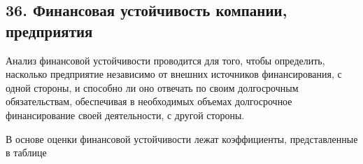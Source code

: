 \subsection*{36. Финансовая устойчивость компании, предприятия}

Анализ финансовой устойчивости проводится для того, чтобы определить, насколько предприятие независимо от внешних источников финансирования, с одной стороны, и способно ли оно отвечать по своим долгосрочным обязательствам, обеспечивая в необходимых объемах долгосрочное финансирование своей деятельности, с другой стороны.

В основе оценки финансовой устойчивости лежат коэффициенты, представленные в таблице

